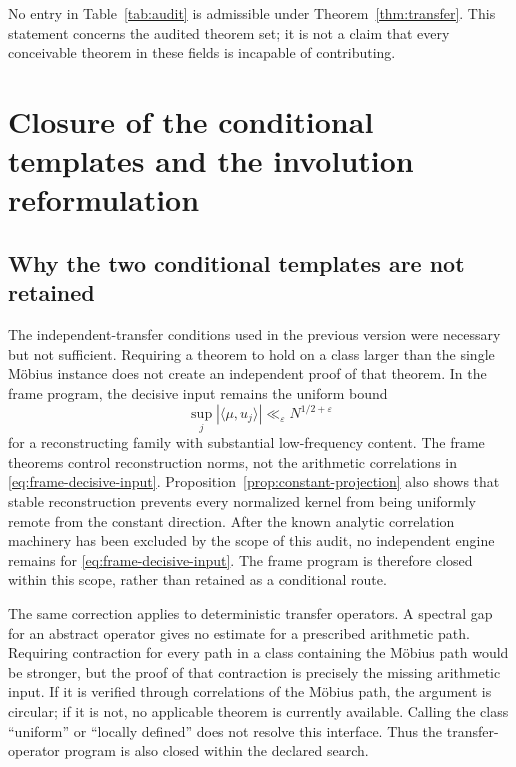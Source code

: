 \documentclass[11pt]{amsart}
\numberwithin{equation}{section}
\theoremstyle{plain}
\theoremstyle{definition}
\theoremstyle{remark}
\newcommand{\eps}{\varepsilon}
\begin{document}
No entry in Table~\ref{tab:audit} is admissible under
Theorem~\ref{thm:transfer}.  This statement concerns the audited theorem set;
it is not a claim that every conceivable theorem in these fields is incapable
of contributing.

\section{Closure of the conditional templates and the involution reformulation}
\label{sec:program}

\subsection{Why the two conditional templates are not retained}
\label{subsec:closed-templates}

The independent-transfer conditions used in the previous version were
necessary but not sufficient.  Requiring a theorem to hold on a class larger
than the single M\"obius instance does not create an independent proof of that
theorem.  In the frame program, the decisive input remains the uniform bound
\begin{equation}
  \sup_j\left|\langle\mu,u_j\rangle\right|
  \ll_{\eps}N^{1/2+\eps}
  \label{eq:frame-decisive-input}
\end{equation}
for a reconstructing family with substantial low-frequency content.  The
frame theorems control reconstruction norms, not the arithmetic correlations
in \eqref{eq:frame-decisive-input}.  Proposition~\ref{prop:constant-projection}
also shows that stable reconstruction prevents every normalized kernel from
being uniformly remote from the constant direction.  After the known analytic
correlation machinery has been excluded by the scope of this audit, no
independent engine remains for \eqref{eq:frame-decisive-input}.  The frame
program is therefore closed within this scope, rather than retained as a
conditional route.

The same correction applies to deterministic transfer operators.  A spectral
gap for an abstract operator gives no estimate for a prescribed arithmetic
path.  Requiring contraction for every path in a class containing the M\"obius
path would be stronger, but the proof of that contraction is precisely the
missing arithmetic input.  If it is verified through correlations of the
M\"obius path, the argument is circular; if it is not, no applicable theorem
is currently available.  Calling the class ``uniform'' or ``locally defined''
does not resolve this interface.  Thus the transfer-operator program is also
closed within the declared search.
\end{document}
